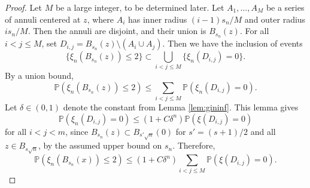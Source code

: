 \documentclass{amsart}
\theoremstyle{plain}
\theoremstyle{definition}
\theoremstyle{remark}
\def\P{\mathbb P}
\begin{document}
\begin{proof}
Let $M$ be a large integer, to be determined later. Let $A_1, \dots, A_M$ be a series of annuli centered at $z$, where $A_i$ has inner radius $(i-1) s_n/M$ and outer radius $i s_n/M$. Then the annuli are disjoint, and their union is $B_{s_n}(z)$. For all $i < j  \le M$, set $D_{i,j}=  B_{s_n} (z) \setminus ( A_i \cup A_j) $. Then we have the inclusion of events
\[
\{ \xi_n ( B_{s_n} (z)) \le 2 \} \subset \bigcup_{i< j \le M}  \{ \xi_n ( D_{i,j} ) = 0\}. 
\]
By a union bound,
\[
\P ( \xi_n ( B_{s_n} (z)) \le 2) \le \sum_{i<j \le M}  \P( \xi_n ( D_{i,j} ) = 0).
\]
Let $\delta \in (0,1)$ denote the constant from  Lemma \ref{lem:gininf}.  This lemma gives
\[
\P( \xi_n ( D_{i,j} ) = 0) \le (1+ C \delta^n) \P( \xi( D_{i,j} ) = 0)
\]
for all $i  < j < m$, 
since $B_{s_{n}}(z) \subset B_{s' \sqrt{n}}(0)$ for $s ' = (s+1)/2$ and all $z \in B_{s\sqrt{n}}$, by the assumed upper bound on $s_n$. 
Therefore,
\begin{equation}\label{unionbd}
	\P ( \xi_n ( B_{s_n} (x)) \le 2) \le (1+ C \delta^n)  \sum_{i<j \le M}  \P( \xi ( D_{i,j} ) = 0).
\end{equation}



\end{proof}
\end{document}
